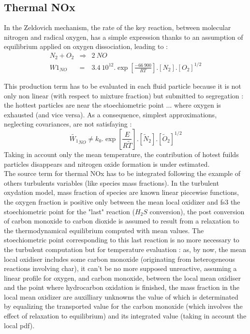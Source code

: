 \subsection{Thermal NOx}
In the Zeldovich mechanism, the rate of the key reaction, between molecular
nitrogen and radical oxygen, has a simple expression thanks to an assumption of
equilibrium applied on oxygen dissociation, leading to :
\begin{eqnarray}
 N_{2} + O_{2} &\Rightarrow& 2 ~NO \nonumber \\
 W1_{NO}&=& 3.4\medspace10^{12}  .   \exp \left[\frac{-66\medspace900}{RT}\right].\left[ N_{2} \right] . \left[O_{2}\right]^{1/2}
\end{eqnarray} 
 
This production term has to be evaluated in each fluid particle because it is not
only non linear (with respect to mixture fraction) but submitted to segregation :
the hottest particles are near the stoechiometric point ... where oxygen is
exhausted (and vice versa). As a consequence, simplest approximations, neglecting
covariances, are not satisfaying :\\

\begin{equation}
 \widetilde{W_1}_{NO} \neq k_0  . \exp \left[\frac{E}{R\tilde{T}}\right].\left[ \widetilde{N}_{2} \right].\left[\widetilde{O}_{2}\right]^{1/2}
\end{equation}
Taking in account only the mean temperature, the contribution of hotest fuilds particles disappears and nitrogen oxide formation is under estimated.\\
The source term for thermal NOx has to be integrated following the example of
others turbulents variables (like species mass fractions). In the turbulent
oxydation model, mass fraction of species are known linear piecewise functions,
the oxygen fraction is positive only between the mean local oxidizer and fs3 the
stoechiometric point for the "last" reaction ($H_{2}S$ conversion), the post
conversion of carbon monoxide to carbon dioxide is assumed to result from a
relaxation to the thermodynamical equilibrium computed with mean values. The
stoechiometric point corresponding to this last reaction is no more necessary to
the turbulent computation but for temperature evaluation : as, by now, the mean
local oxidiser includes some carbon monoxide (originating from heterogeneous
reactions involving char), it can't be no more supposed unreactive, assuming a
linear profile for oxygen, and carbon monoxide, between the local mean oxidiser
and the point where hydrocarbon oxidation is finished, the mass fraction in the
local mean oxidizer are auxilliary unknowns the value of which is determinated
by equalizing the transported value for the carbon monoxide (which involves the
effect of relaxation to equilibrium) and its integrated value (taking in account
the local pdf).
   

